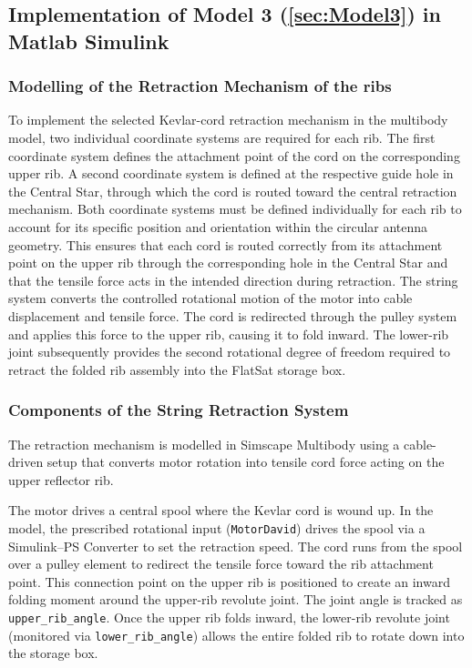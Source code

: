 	\subsection{Implementation of Model 3 (\ref{sec:Model3}) in Matlab Simulink}
	
	\subsubsection{Modelling of the Retraction Mechanism of the ribs}
	
To implement the selected Kevlar-cord retraction mechanism in the multibody model, two individual coordinate systems are required for each rib. The first coordinate system defines the attachment point of the cord on the corresponding upper rib. A second coordinate system is defined at the respective guide hole in the Central Star, through which the cord is routed toward the central retraction mechanism. Both coordinate systems must be defined individually for each rib to account for its specific position and orientation within the circular antenna geometry. This ensures that each cord is routed correctly from its attachment point on the upper rib through the corresponding hole in the Central Star and that the tensile force acts in the intended direction during retraction.
The string system converts the controlled rotational motion of the motor into cable displacement and tensile force. The cord is redirected through the pulley system and applies this force to the upper rib, causing it to fold inward. The lower-rib joint subsequently provides the second rotational degree of freedom required to retract the folded rib assembly into the FlatSat storage box.


\subsubsection*{Components of the String Retraction System}

The retraction mechanism is modelled in Simscape Multibody using a cable-driven setup that converts motor rotation into tensile cord force acting on the upper reflector rib. 

The motor drives a central spool where the Kevlar cord is wound up. In the model, the prescribed rotational input (\texttt{MotorDavid}) drives the spool via a Simulink--PS Converter to set the retraction speed. The cord runs from the spool over a pulley element to redirect the tensile force toward the rib attachment point. This connection point on the upper rib is positioned to create an inward folding moment around the upper-rib revolute joint. The joint angle is tracked as \texttt{upper\_rib\_angle}. Once the upper rib folds inward, the lower-rib revolute joint (monitored via \texttt{lower\_rib\_angle}) allows the entire folded rib to rotate down into the storage box.

